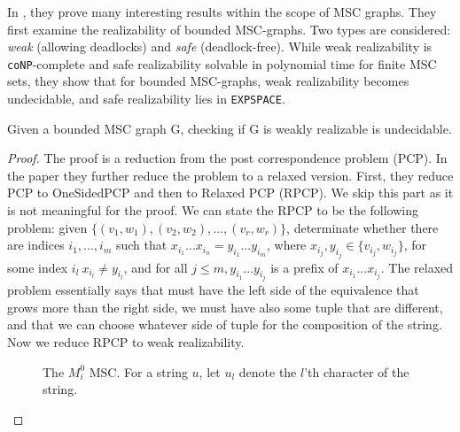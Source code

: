 In \cite{alur2005realizability}, they prove many interesting results within the scope of MSC graphs.
They first examine the realizability of bounded MSC-graphs. Two types are considered: 
\textit{weak} (allowing deadlocks) and \textit{safe} (deadlock-free). While weak realizability is \verb|coNP|-complete
and safe realizability solvable in polynomial time for finite MSC sets, they show that for
bounded MSC-graphs, weak realizability becomes undecidable, and safe realizability lies in 
\verb|EXPSPACE|.

\begin{theorem}
Given a bounded MSC graph G, checking if G is weakly realizable is undecidable.
\end{theorem}

\begin{proof}
The proof is a reduction from the post correspondence problem (PCP). In the paper \cite{alur2005realizability}
they further reduce the problem to a relaxed version. First, they reduce PCP to OneSidedPCP and then to
Relaxed PCP (RPCP). We skip this part as it is not meaningful for the proof. We can state the RPCP to be the following
problem: given $\{(v_1, w_1), (v_2, w_2), ..., (v_r, w_r)\}$, determinate whether there are indices $i_1, ..., i_m$
such that $x_{i_1}...x_{i_n}=y_{i_1}...y_{i_m}$, where $x_{i_j}, y_{i_j} \in \{v_{i_j},w_{i_j}\}$, for some
index $i_l \  x_{i_l}\neq y_{i_l}$, and for all $j\leq m,y_{i_1}...y_{i_j}$ is a prefix of $x_{i_1}...x_{i_j}$.
The relaxed problem essentially says that must have the left side of the equivalence that grows more than the right side,
we must have also some tuple that are different, and that we can choose whatever side of tuple for the composition
of the string. Now we reduce RPCP to weak realizability.


\begin{figure}[h]
\centering
\begin{msc}[draw frame=none, draw head=none, msc keyword=, head height=0px, label distance=0.5ex, foot height=0px, foot distance=0px]{}

\end{msc}
\caption{The $M_i^0$ MSC. For a string $u$, let $u_l$ denote the $l$’th character of the string.}
\label{fig:msc}
\end{figure}


\end{proof}
